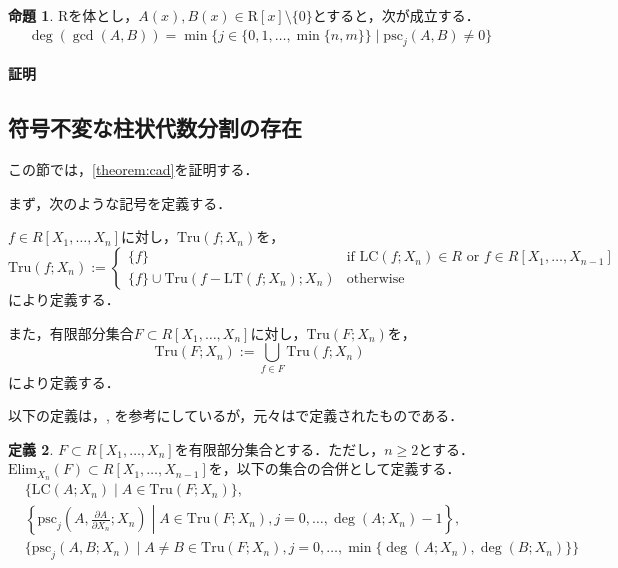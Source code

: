 \documentclass[uplatex, dvipdfmx]{jsarticle}
\makeatletter
\numberwithin{equation}{section}
\renewenvironment{proof}[1][\proofname]{\par
  \pushQED{\qed}%
  \normalfont \topsep6\p@\@plus6\p@\relax
  \trivlist
  \item\relax
  {\bfseries
  #1\@addpunct{.}}\hspace\labelsep\ignorespaces
}{
  \popQED\endtrivlist\@endpefalse
}
\newcommand{\psc}{\mathrm{psc}}
\newcommand{\PSC}{\mathrm{PSC}}
\newcommand{\Elim}{\mathrm{Elim}}
\newcommand{\Tru}{\mathrm{Tru}}
\newcommand{\LT}{\mathrm{LT}}
\newcommand{\LC}{\mathrm{LC}}
\theoremstyle{definition}
\newtheorem{definition}{定義}[section]
\newtheorem{proposition}[definition]{命題}
\renewcommand{\proofname}{\textbf{証明}}
\makeatother
\begin{document}
\begin{proposition}\label{proposition:psc}
$\mathrm{R}$を体とし，$A(x), B(x) \in \mathrm{R}[x] \setminus \{0\}$とすると，次が成立する．
\begin{align}
\deg(\gcd(A, B)) = \min \{ j  \in \{0,1, \dots, \min\{n,m\}\}\mid \psc_j(A,B) \neq 0\}
\end{align}
\end{proposition}

\begin{proof}
\end{proof}

\subsection{符号不変な柱状代数分割の存在}
この節では，\cref{theorem:cad}を証明する．

まず，次のような記号を定義する．

$f \in R[X_1, \dots, X_n]$に対し，$\Tru(f;X_n)$を，
\begin{equation}
     \Tru(f;X_n):= \begin{cases}
          \{f\} &  \text{if $\LC(f; X_n) \in R$ or $f \in R[X_1, \dots, X_{n-1}]$} \\
          \{f\} \cup \Tru(f-\LT(f;X_n);X_n) & \text{otherwise}
     \end{cases}
\end{equation}
により定義する．

また，有限部分集合$F \subset R[X_1, \dots, X_n]$に対し，$\Tru(F;X_n)$を，
\begin{equation}
     \Tru(F;X_n) := \bigcup_{f \in F} \Tru(f;X_n)
\end{equation}
により定義する．

以下の定義は，\cite[Section 3]{MR0764184}, \cite[Notation 5.15.]{MR2248869}
を参考にしているが，元々は\cite[Theorem 4]{MR0403962}で定義されたものである．


\begin{definition}
$F \subset R[X_1, \dots, X_n]$を有限部分集合とする．ただし，$n \geq 2$とする．
$\Elim_{X_n}(F) \subset R[X_1, \dots, X_{n-1}]$を，以下の集合の合併として定義する．
\begin{align} 
     &\{\LC(A;X_n) \mid A \in \Tru(F;X_n) \},\\
     &\left\{ \psc_j\left(A,\frac{\partial A}{\partial X_n};X_n\right) \middle| A \in \Tru(F;X_n), j= 0, \dots, \deg(A;X_n)-1\right\},\\
     &\{\psc_j(A,B;X_n) \mid A \neq B \in \Tru(F; X_n), j = 0, \dots, \min\{\deg(A;X_n), \deg(B;X_n)\}\}
\end{align}
\end{definition}
\end{document}
